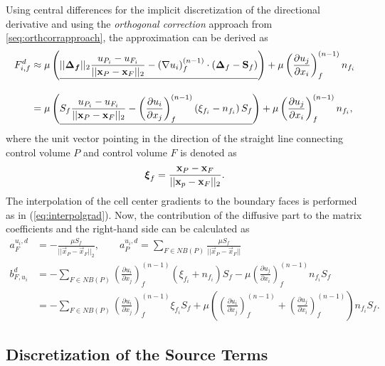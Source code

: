 Using central differences for the implicit discretization of the directional derivative and using the \emph{orthogonal correction} approach from \ref{seq:orthcorrapproach}, the approximation can be derived as
\begin{align*}
  F_{i,f}^d 
  &\approx 
  \mu \left( \underline{||\boldsymbol{\boldsymbol{\Delta}_f}||_2 \frac{u_{P_i} - u_{F_i}}{ || \mathbf{x}_P - \mathbf{x}_F ||_2 }  
  -  \left(\nabla u_i \right)_f^{(n-1)} \cdot \left(\boldsymbol{\Delta}_f - \mathbf{S}_f\right)  }  \right)
  + \mu \left( \frac{\partial u_j}{\partial x_i} \right)_f^{(n-1)} n_{f_i} \\[1em]
  &= \mu \left(\underline{  S_f \frac{u_{P_i} - u_{F_i}}{ || \mathbf{x}_P - \mathbf{x}_F ||_2 }  
  - \left( \frac{\partial u_i}{\partial x_j}\right)_f^{(n-1)} \left(\xi_{f_i} - n_{f_i}\right)S_f  } \right)
  + \mu \left( \frac{\partial u_j}{\partial x_i} \right)_f^{(n-1)} n_{f_i},
\end{align*}
where the unit vector pointing in the direction of the straight line connecting control volume \(P\) and control volume \(F\) is denoted as
\begin{displaymath}
  \boldsymbol{\xi}_f = \frac{\mathbf{x}_P - \mathbf{x}_F}{|| \mathbf{x}_p - \mathbf{x}_F ||_2}.
\end{displaymath}
The interpolation of the cell center gradients to the boundary faces is performed as in (\ref{eq:interpolgrad}). Now, the contribution of the diffusive part to the matrix coefficients and the right-hand side can be calculated as
\begin{align*}
  a_F^{u_i,d} &= - \frac{\mu S_f}{||\vec{x}_P - \vec{x}_F||_2}, 
  \quad \quad a_P^{u_i,d} = \sum_{F \in NB(P)} \frac{\mu S_f}{|| \vec{x}_P - \vec{x}_F ||} \\[1em]
  b_{F,u_i}^d &=  - \sum_{F \in NB(P)} \left( \frac{\partial u_i}{\partial x_j}\right)_f^{(n-1)} \left(\xi_{f_i} + n_{f_i}\right)S_f  
  - \mu \left( \frac{\partial u_j}{\partial x_i} \right)_f^{(n-1)} n_{f_i} S_f   \nonumber \\[0.5em]
  &=  - \sum_{F \in NB(P)} \left( \frac{\partial u_i}{\partial x_j}\right)_f^{(n-1)} \xi_{f_i} S_f
  + \mu \left( \left( \frac{\partial u_i}{\partial x_j} \right)_f^{(n-1)}
  + \left( \frac{\partial u_j}{\partial x_i} \right)_f^{(n-1)} \right) n_{f_i} S_f.
\end{align*}

\subsection{Discretization of the Source Terms}

